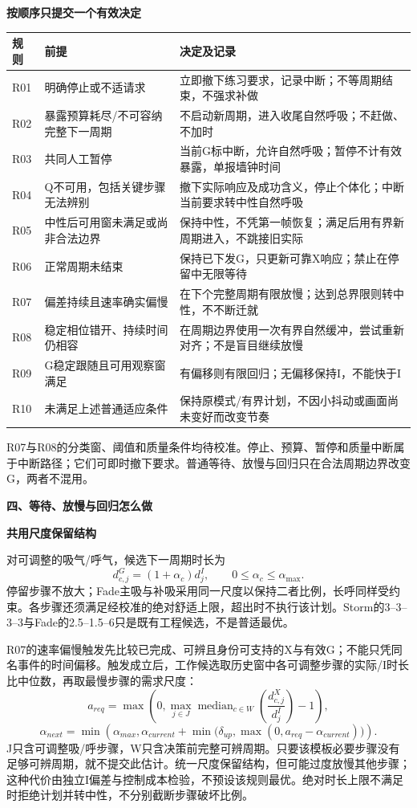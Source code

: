 \documentclass[11pt,a4paper]{article}
\newcommand{\reviewsection}[1]{\par\Needspace{6\baselineskip}\begin{center}{\titlelatin\titlecjk\bfseries\fontsize{14}{20}\selectfont #1}\end{center}}
\newcommand{\reviewsubsection}[1]{\par\Needspace{4\baselineskip}\begin{center}{\titlelatin\titlecjk\bfseries\fontsize{12}{18}\selectfont #1}\end{center}}
\begin{document}
\reviewsubsection{3.2 按顺序只提交一个有效决定}
\begin{longtable}{L{18mm}L{55mm}L{81mm}}
规则 & 前提 & 决定及记录\\\hline
R01 & 明确停止或不适请求 & 立即撤下练习要求，记录中断；不等周期结束，不强求补做\\
R02 & 暴露预算耗尽/不可容纳完整下一周期 & 不启动新周期，进入收尾自然呼吸；不赶做、不加时\\
R03 & 共同人工暂停 & 当前G标中断，允许自然呼吸；暂停不计有效暴露，单报墙钟时间\\
R04 & Q不可用，包括关键步骤无法辨别 & 撤下实际响应及成功含义，停止个体化；中断当前要求转中性自然呼吸\\
R05 & 中性后可用窗未满足或尚非合法边界 & 保持中性，不凭第一帧恢复；满足后用有界新周期进入，不跳接旧实际\\
R06 & 正常周期未结束 & 保持已下发G，只更新可靠X响应；禁止在停留中无限等待\\
R07 & 偏差持续且速率确实偏慢 & 在下个完整周期有限放慢；达到总界限则转中性，不不断迁就\\
R08 & 稳定相位错开、持续时间仍相容 & 在周期边界使用一次有界自然缓冲，尝试重新对齐；不是盲目继续放慢\\
R09 & G稳定跟随且可用观察窗满足 & 有偏移则有限回归；无偏移保持I，不能快于I\\
R10 & 未满足上述普通适应条件 & 保持原模式/有界计划，不因小抖动或画面尚未变好而改变节奏\\
\end{longtable}

R07与R08的分类窗、阈值和质量条件均待校准。停止、预算、暂停和质量中断属于中断路径；它们可即时撤下要求。普通等待、放慢与回归只在合法周期边界改变G，两者不混用。

\reviewsection{四、等待、放慢与回归怎么做}
\reviewsubsection{4.1 共用尺度保留结构}
对可调整的吸气/呼气，候选下一周期时长为
\[d^{G}_{c,j}=(1+\alpha_c)d^{I}_{j},\qquad 0\leq\alpha_c\leq\alpha_{\max}.\]
停留步骤不放大；Fade主吸与补吸采用同一尺度以保持二者比例，长呼同样受约束。各步骤还须满足经校准的绝对舒适上限，超出时不执行该计划。Storm的3--3--3--3与Fade的2.5--1.5--6只是既有工程候选，不是普适最优。

R07的速率偏慢触发先比较已完成、可辨且身份可支持的X与有效G；不能只凭同名事件的时间偏移。触发成立后，工作候选取历史窗中各可调整步骤的实际/I时长比中位数，再取最慢步骤的需求尺度：
\[a_{req}=\max\!\left(0,\max_{j\in J}\operatorname{median}_{c\in W}\left(\frac{d^X_{c,j}}{d^I_j}\right)-1\right),\]
\[\alpha_{next}=\min\!\left(\alpha_{max},\alpha_{current}+\min\bigl(\delta_{up},\max(0,a_{req}-\alpha_{current})\bigr)\right).\]
J只含可调整吸/呼步骤，W只含决策前完整可辨周期。只要该模板必要步骤没有足够可辨周期，就不提交此估计。统一尺度保留结构，但可能过度放慢其他步骤；这种代价由独立I偏差与控制成本检验，不预设该规则最优。绝对时长上限不满足时拒绝计划并转中性，不分别截断步骤破坏比例。
\end{document}
